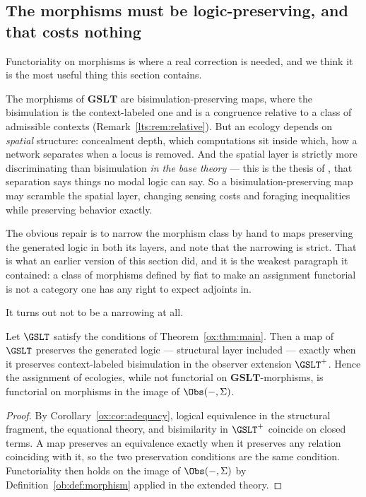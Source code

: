\subsection{The morphisms must be logic-preserving, and that costs nothing}\label{sci:S15.3}

Functoriality on morphisms is where a real correction is needed, and we think it is the most useful
thing this section contains.

The morphisms of $\mathbf{GSLT}$ are bisimulation-preserving maps, where the bisimulation is the
context-labeled one and is a congruence relative to a class of admissible contexts
(Remark~\ref{lts:rem:relative}). But an ecology depends on \emph{spatial} structure: concealment
depth, which computations sit inside which, how a network separates when a locus is removed. And the
spatial layer is strictly more discriminating than bisimulation \emph{in the base theory} --- this is
the thesis of \cite{ClassifierNote}, that separation says things no modal logic can say. So a
bisimulation-preserving map may scramble the spatial layer, changing sensing costs and foraging
inequalities while preserving behavior exactly.

The obvious repair is to narrow the morphism class by hand to maps preserving the generated logic in
both its layers, and note that the narrowing is strict. That is what an earlier version of this
section did, and it is the weakest paragraph it contained: a class of morphisms defined by fiat to
make an assignment functorial is not a category one has any right to expect adjoints in.

It turns out not to be a narrowing at all.

\begin{proposition}
\label{sci:prop:morphisms}
Let $\GSLT$ satisfy the conditions of Theorem~\ref{ox:thm:main}. Then a map of $\GSLT$ preserves the
generated logic --- structural layer included --- exactly when it preserves context-labeled
bisimulation in the observer extension $\GSLT^{+}$. Hence the assignment of ecologies, while not
functorial on $\mathbf{GSLT}$-morphisms, is functorial on morphisms in the image of
$\Obs(-,\Sigma)$.
\end{proposition}

\begin{proof}
By Corollary~\ref{ox:cor:adequacy}, logical equivalence in the structural fragment, the equational
theory, and bisimilarity in $\GSLT^{+}$ coincide on closed terms. A map preserves an equivalence
exactly when it preserves any relation coinciding with it, so the two preservation conditions are the
same condition. Functoriality then holds on the image of $\Obs(-,\Sigma)$ by
Definition~\ref{ob:def:morphism} applied in the extended theory.
\end{proof}

